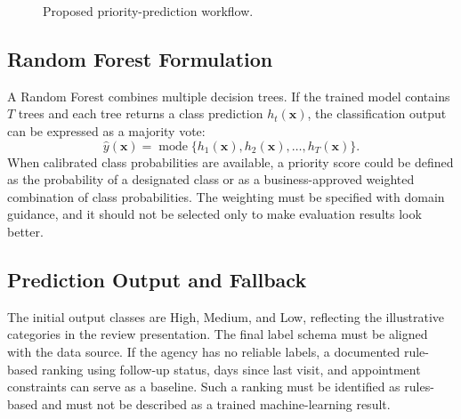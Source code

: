 \documentclass[12pt,a4paper,oneside]{report}
\begin{document}
\begin{figure}[htbp]
\centering
{}
\caption{Proposed priority-prediction workflow.}
\label{fig:ml-pipeline}
\end{figure}

\subsection{Random Forest Formulation}
A Random Forest combines multiple decision trees. If the trained model contains $T$ trees and each tree returns a class prediction $h_t(\mathbf{x})$, the classification output can be expressed as a majority vote:
\begin{equation}
\hat{y}(\mathbf{x}) = \operatorname{mode}\{h_1(\mathbf{x}),h_2(\mathbf{x}),\ldots,h_T(\mathbf{x})\}.
\end{equation}
When calibrated class probabilities are available, a priority score could be defined as the probability of a designated class or as a business-approved weighted combination of class probabilities. The weighting must be specified with domain guidance, and it should not be selected only to make evaluation results look better.

\subsection{Prediction Output and Fallback}
The initial output classes are High, Medium, and Low, reflecting the illustrative categories in the review presentation. The final label schema must be aligned with the data source. If the agency has no reliable labels, a documented rule-based ranking using follow-up status, days since last visit, and appointment constraints can serve as a baseline. Such a ranking must be identified as rules-based and must not be described as a trained machine-learning result.
\end{document}
